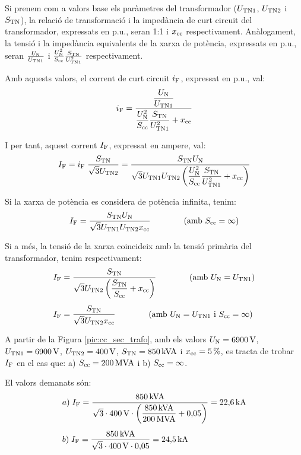  Si prenem com a valors base els
par\`{a}metres del transformador ($U_\mathrm{TN1}$, $U_\mathrm{TN2}$ i
$S_\mathrm{TN}$), la relaci\'{o} de transformaci\'{o} i la imped\`{a}ncia de curt
circuit del transformador, expressats en p.u., seran 1:1 i
$x_\mathrm{cc}$ respectivament. An\`{a}logament, la tensi\'{o} i la imped\`{a}ncia
equivalents de la xarxa de pot\`{e}ncia, expressats en p.u., seran
$\frac{U_\mathrm{N}}{U_\mathrm{TN1}}$ i $\frac{U_\mathrm{N}^2}{S_\mathrm{cc}}
\frac{S_\mathrm{TN}}{U_\mathrm{TN1}^2}$ respectivament.

Amb aquests valors, el corrent de curt circuit $i_\mathrm{F}$, expressat
en p.u., val:
\begin{equation}
    i_\mathrm{F} = \frac{\dfrac{U_\mathrm{N}}{U_\mathrm{TN1}}}{\dfrac{U_\mathrm{N}^2}{S_\mathrm{cc}}
    \dfrac{S_\mathrm{TN}}{U_\mathrm{TN1}^2} + x_\mathrm{cc}}
\end{equation}

I per tant, aquest corrent $I_\mathrm{F}$, expressat en ampere, val:
\begin{equation}
    I_\mathrm{F} = i_\mathrm{F}\; \frac{S_\mathrm{TN}}{\sqrt{3}U_\mathrm{TN2}} =
    \frac{S_\mathrm{TN} U_\mathrm{N}}{\sqrt{3} U_\mathrm{TN1}U_\mathrm{TN2}
    \left(\dfrac{U_\mathrm{N}^2}{S_\mathrm{cc}}
    \dfrac{S_\mathrm{TN}}{U_\mathrm{TN1}^2} + x_\mathrm{cc}\right)}
\end{equation}

Si la xarxa de pot\`{e}ncia es considera de pot\`{e}ncia infinita, tenim:
\begin{equation}
    I_\mathrm{F} = \frac{S_\mathrm{TN} U_\mathrm{N}}{\sqrt{3} U_\mathrm{TN1}U_\mathrm{TN2}
    x_\mathrm{cc}}\qquad\qquad (\text{amb }S_\mathrm{cc}=\infty)
\end{equation}

Si a m\'{e}s, la tensi\'{o} de la xarxa coincideix amb la tensi\'{o} prim\`{a}ria
del transformador, tenim respectivament:
\begin{align}
    I_\mathrm{F} &= \frac{S_\mathrm{TN}}{\sqrt{3} U_\mathrm{TN2}
    \left(\dfrac{S_\mathrm{TN}}{S_\mathrm{cc}} +
    x_\mathrm{cc}\right)}\qquad\qquad(\text{amb }U_\mathrm{N}=U_\mathrm{TN1})\\[1ex]
    I_\mathrm{F} &= \frac{S_\mathrm{TN}}{\sqrt{3} U_\mathrm{TN2}
    x_\mathrm{cc}}\qquad\qquad(\text{amb }U_\mathrm{N}=U_\mathrm{TN1}\text{ i }
    S_\mathrm{cc}=\infty)
\end{align}

\begin{exemple}
A partir de la Figura \vref{pic:cc_sec_trafo}, amb els valors
$U_\mathrm{N}=6900\mathrm{\,V}$, $U_\mathrm{TN1}=6900\mathrm{\,V}$,
$U_\mathrm{TN2}=400\mathrm{\,V}$, $S_\mathrm{TN}=850\mathrm{\,kVA}$ i
$x_\mathrm{cc}=5\mathrm{\,\%}$, es tracta de trobar $I_\mathrm{F}$ en el cas
que: a) $S_\mathrm{cc}=200\mathrm{\,MVA}$ i b) $S_\mathrm{cc}=\infty$.

El valors demanats s\'{o}n:
\begin{align*}
   &a)\;I_\mathrm{F} = \frac{850\mathrm{\,kVA}}{\sqrt{3}\cdot 400\mathrm{\,V}\cdot
   \left(\dfrac{850\mathrm{\,kVA}}{200\mathrm{\,MVA}} +
   0{,}05\right)} = 22{,}6\mathrm{\,kA} \\[1ex]
   &b)\;I_\mathrm{F} = \frac{850\mathrm{\,kVA}}{\sqrt{3}\cdot 400\mathrm{\,V}\cdot
   0{,}05} = 24{,}5\mathrm{\,kA}
\end{align*}

\end{exemple}


